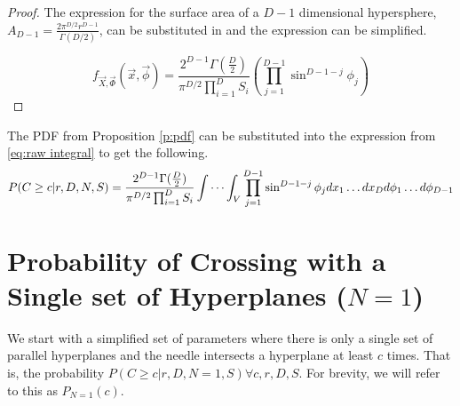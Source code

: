 \documentclass{article}
\begin{document}
\begin{proof}
	The expression for the surface area of a $D-1$ dimensional hypersphere, 
	$A_{D-1}=\frac{2\pi^{D/2}r^{D-1}}{\Gamma(D/2)}$,
	can be substituted in and the expression can be simplified.

	\begin{equation}\label{eq:general pdf}
		f_{\vec{X},\vec{\Phi}}(\vec{x}, \vec{\phi}) = \frac{2^{D-1}\Gamma(\frac{D}{2})}{\pi^{D/2}\prod_{i=1}^DS_i} \left(\prod_{j=1}^{D-1}\sin^{D-1-j}\phi_j\right)
	\end{equation}
\end{proof}

The PDF from Proposition \ref{p:pdf} can be substituted into the expression from \ref{eq:raw integral}
to get the following.
\begin{align} 
	P(C\ge c|r, D, N, S)=\frac{2^{D-1}\Gamma(\frac{D}{2})}{\pi^{D/2}\prod_{i=1}^DS_i} \idotsint_V \prod_{j=1}^{D-1}\sin^{D-1-j}\phi_j dx_1\hdots dx_D d\phi_1 \hdots d\phi_{D-1} \label{eq:volume integral}
\end{align}


\section{Probability of Crossing with a Single set of Hyperplanes ($N=1$)} \label{s:n=1}
We start with a simplified set of parameters where there is only a single set of parallel hyperplanes and the needle intersects a
hyperplane at least $c$ times. That is, the probability $P(C\ge c | r, D, N=1, S) \forall c, r, D, S$. For brevity, we will refer to this
as $P_{N=1}(c)$. 
\end{document}
